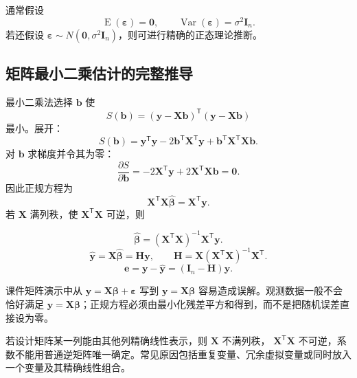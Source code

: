 \documentclass[11pt,a4paper]{article}
\theoremstyle{definition}
\theoremstyle{plain}
\theoremstyle{remark}
\newcommand{\E}{\operatorname{E}}
\newcommand{\Var}{\operatorname{Var}}
\begin{document}
通常假设
\[
    \E(\boldsymbol\varepsilon)=\boldsymbol 0,\qquad
    \Var(\boldsymbol\varepsilon)=\sigma^2\boldsymbol I_n.
\]
若还假设 $\boldsymbol\varepsilon\sim N(\boldsymbol0,\sigma^2\boldsymbol I_n)$，则可进行精确的正态理论推断。

\subsection{矩阵最小二乘估计的完整推导}

最小二乘法选择 $\boldsymbol b$ 使
\[
    S(\boldsymbol b)
    =
    (\boldsymbol y-\boldsymbol X\boldsymbol b)^{\mathsf T}
    (\boldsymbol y-\boldsymbol X\boldsymbol b)
\]
最小。展开：
\[
    S(\boldsymbol b)
    =
    \boldsymbol y^{\mathsf T}\boldsymbol y
    -2\boldsymbol b^{\mathsf T}\boldsymbol X^{\mathsf T}\boldsymbol y
    +\boldsymbol b^{\mathsf T}\boldsymbol X^{\mathsf T}\boldsymbol X\boldsymbol b.
\]
对 $\boldsymbol b$ 求梯度并令其为零：
\[
    \frac{\partial S}{\partial\boldsymbol b}
    =
    -2\boldsymbol X^{\mathsf T}\boldsymbol y
    +2\boldsymbol X^{\mathsf T}\boldsymbol X\boldsymbol b
    =\boldsymbol0.
\]
因此正规方程为
\[
    \boldsymbol X^{\mathsf T}\boldsymbol X\hat{\boldsymbol\beta}
    =
    \boldsymbol X^{\mathsf T}\boldsymbol y.
\]
若 $\boldsymbol X$ 满列秩，使 $\boldsymbol X^{\mathsf T}\boldsymbol X$ 可逆，则

\begin{memorybox}
\[
    \boxed{
    \hat{\boldsymbol\beta}
    =
    (\boldsymbol X^{\mathsf T}\boldsymbol X)^{-1}
    \boldsymbol X^{\mathsf T}\boldsymbol y.
    }
\]
\[
    \boxed{
    \hat{\boldsymbol y}
    =
    \boldsymbol X\hat{\boldsymbol\beta}
    =
    \boldsymbol H\boldsymbol y,
    \qquad
    \boldsymbol H=
    \boldsymbol X(\boldsymbol X^{\mathsf T}\boldsymbol X)^{-1}
    \boldsymbol X^{\mathsf T}.
    }
\]
\[
    \boxed{
    \boldsymbol e
    =
    \boldsymbol y-\hat{\boldsymbol y}
    =
    (\boldsymbol I_n-\boldsymbol H)\boldsymbol y.
    }
\]
\end{memorybox}

\begin{warnbox}[不能直接删去误差项]
课件矩阵演示中从 $\boldsymbol y=\boldsymbol X\boldsymbol\beta+\boldsymbol\varepsilon$ 写到
$\boldsymbol y=\boldsymbol X\boldsymbol\beta$ 容易造成误解。观测数据一般不会恰好满足
$\boldsymbol y=\boldsymbol X\boldsymbol\beta$；正规方程必须由最小化残差平方和得到，而不是把随机误差直接设为零。
\end{warnbox}

\begin{warnbox}[满列秩与完全多重共线性]
若设计矩阵某一列能由其他列精确线性表示，则 $\boldsymbol X$ 不满列秩，
$\boldsymbol X^{\mathsf T}\boldsymbol X$ 不可逆，系数不能用普通逆矩阵唯一确定。常见原因包括重复变量、冗余虚拟变量或同时放入一个变量及其精确线性组合。
\end{warnbox}
\end{document}
